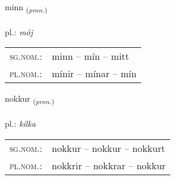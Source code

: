 \documentclass[frontgrid, backgrid]{flacards}\usepackage[]{graphicx}\usepackage[]{xcolor}
\begin{document}
{minn \small{\textsubscript{(\textit{pron.})}} \\[1ex] %
\textphonetic{[mɪn]} \\
pl.: \emph{mój} \\  [2ex]
\renewcommand*{\arraystretch}{0.8}
\begin{tabular}{ll}
\textsc{sg.nom.}: & minn  --  mín -- mitt \\ 
\textsc{pl.nom.}: & mínir -- mínar -- mín
\end{tabular}
}

\renewcommand{\flhead}{\vskip5pt \fboxsep=0pt {\small\bfseries\footnotesize Fornafn | zaimek}}
\renewcommand{\fcfoot}{\vskip5pt \fboxsep=0pt \hspace{2pt}{\small\bfseries\footnotesize 1K}}

\renewcommand{\blhead}{\vskip5pt {\small\bfseries\footnotesize Fornafn | zaimek }}
\renewcommand{\bcfoot}{\vskip5pt \hspace{2pt}{\small\bfseries\footnotesize 1K}}


{nokkur \small{\textsubscript{(\textit{pron.})}} \\[1ex] %
\textphonetic{[nɔhkʏr]} \\
pl.: \emph{kilka} \\  [2ex]
\renewcommand*{\arraystretch}{0.8}
\begin{tabular}{ll}
\textsc{sg.nom.}: & nokkur  --  nokkur -- nokkurt \\ 
\textsc{pl.nom.}: & nokkrir -- nokkrar -- nokkur
\end{tabular}
}

\renewcommand{\flhead}{\vskip5pt \fboxsep=0pt {\small\bfseries\footnotesize Sagnorð | czasownik}}
\renewcommand{\fcfoot}{\vskip5pt \fboxsep=0pt \hspace{2pt}{\small\bfseries\footnotesize 1K}}

\renewcommand{\blhead}{\vskip5pt {\small\bfseries\footnotesize Sagnorð | czasownik }}
\renewcommand{\bcfoot}{\vskip5pt \hspace{2pt}{\small\bfseries\footnotesize 1K}}
\end{document}
